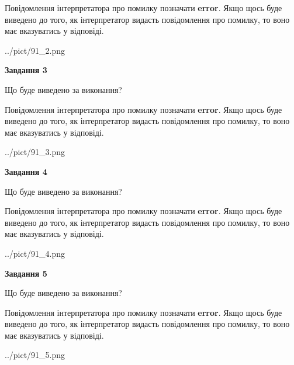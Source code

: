 \documentclass[12pt, ukrainian]{article}
\begin{document}
{\begin {large}
Повідомлення інтерпретатора про помилку позначати \textbf{error}.
Якщо щось буде виведено до того, як інтерпретатор видасть повідомлення про помилку, 
то воно має вказуватись у відповіді. \par


\begin{center}
	{../pict/91_2.png}
\end{center}
\newpage

{\begin {center}\textbf{Завдання 3}\end {center}}\par
Що буде виведено за виконання?

Повідомлення інтерпретатора про помилку позначати \textbf{error}.
Якщо щось буде виведено до того, як інтерпретатор видасть повідомлення про помилку, 
то воно має вказуватись у відповіді. \par


\begin{center}
	{../pict/91_3.png}
\end{center}
\newpage

{\begin {center}\textbf{Завдання 4}\end {center}}\par
Що буде виведено за виконання?

Повідомлення інтерпретатора про помилку позначати \textbf{error}.
Якщо щось буде виведено до того, як інтерпретатор видасть повідомлення про помилку, 
то воно має вказуватись у відповіді. \par


\begin{center}
	{../pict/91_4.png}
\end{center}
\newpage

{\begin {center}\textbf{Завдання 5}\end {center}}\par
Що буде виведено за виконання?

Повідомлення інтерпретатора про помилку позначати \textbf{error}.
Якщо щось буде виведено до того, як інтерпретатор видасть повідомлення про помилку, 
то воно має вказуватись у відповіді. \par


\begin{center}
	{../pict/91_5.png}
\end{center}
\newpage


\end{large}}
\end{document}
